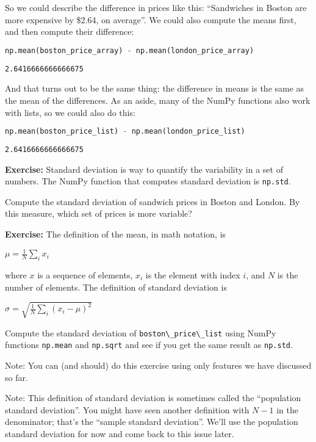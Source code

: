 So we could describe the difference in prices like this: ``Sandwiches in
Boston are more expensive by \$2.64, on average''. We could also compute
the means first, and then compute their difference:

\begin{lstlisting}[language=Python]
np.mean(boston_price_array) - np.mean(london_price_array)
\end{lstlisting}

\begin{lstlisting}[]
2.6416666666666675
\end{lstlisting}

And that turns out to be the same thing: the difference in means is the
same as the mean of the differences. As an aside, many of the NumPy
functions also work with lists, so we could also do this:

\begin{lstlisting}[language=Python]
np.mean(boston_price_list) - np.mean(london_price_list)
\end{lstlisting}

\begin{lstlisting}[]
2.6416666666666675
\end{lstlisting}

\textbf{Exercise:} Standard deviation is way to quantify the variability
in a set of numbers. The NumPy function that computes standard deviation
is \passthrough{\lstinline!np.std!}.

Compute the standard deviation of sandwich prices in Boston and London.
By this measure, which set of prices is more variable?

\textbf{Exercise:} The definition of the mean, in math notation, is

\(\mu = \frac{1}{N} \sum_i x_i\)

where \(x\) is a sequence of elements, \(x_i\) is the element with index
\(i\), and \(N\) is the number of elements. The definition of standard
deviation is

\(\sigma = \sqrt{\frac{1}{N} \sum_i (x_i - \mu)^2}\)

Compute the standard deviation of
\passthrough{\lstinline!boston\_price\_list!} using NumPy functions
\passthrough{\lstinline!np.mean!} and \passthrough{\lstinline!np.sqrt!}
and see if you get the same result as \passthrough{\lstinline!np.std!}.

Note: You can (and should) do this exercise using only features we have
discussed so far.

Note: This definition of standard deviation is sometimes called the
``population standard deviation''. You might have seen another
definition with \(N-1\) in the denominator; that's the ``sample standard
deviation''. We'll use the population standard deviation for now and
come back to this issue later.

